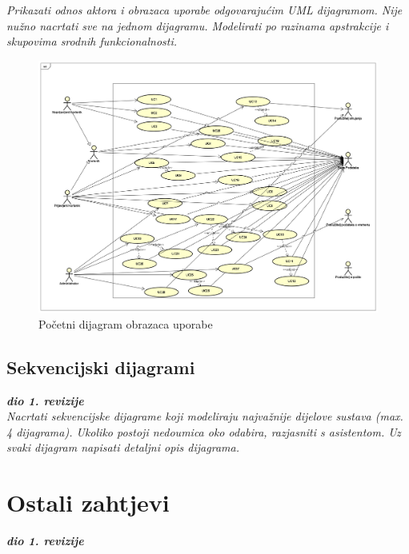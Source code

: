					\textit{Prikazati odnos aktora i obrazaca uporabe odgovarajućim UML dijagramom. Nije nužno nacrtati sve na jednom dijagramu. Modelirati po razinama apstrakcije i skupovima srodnih funkcionalnosti.}
					\begin{figure}
						\includegraphics[width=\linewidth]{UseCaseDiagram.png}
						\caption{Početni dijagram obrazaca uporabe}
					\end{figure}
				\eject		
				
			\subsection{Sekvencijski dijagrami}
				
				\textbf{\textit{dio 1. revizije}}\\
				
				\textit{Nacrtati sekvencijske dijagrame koji modeliraju najvažnije dijelove sustava (max. 4 dijagrama). Ukoliko postoji nedoumica oko odabira, razjasniti s asistentom. Uz svaki dijagram napisati detaljni opis dijagrama.}
				\eject
	
		\section{Ostali zahtjevi}
		
			\textbf{\textit{dio 1. revizije}}\\
		 
